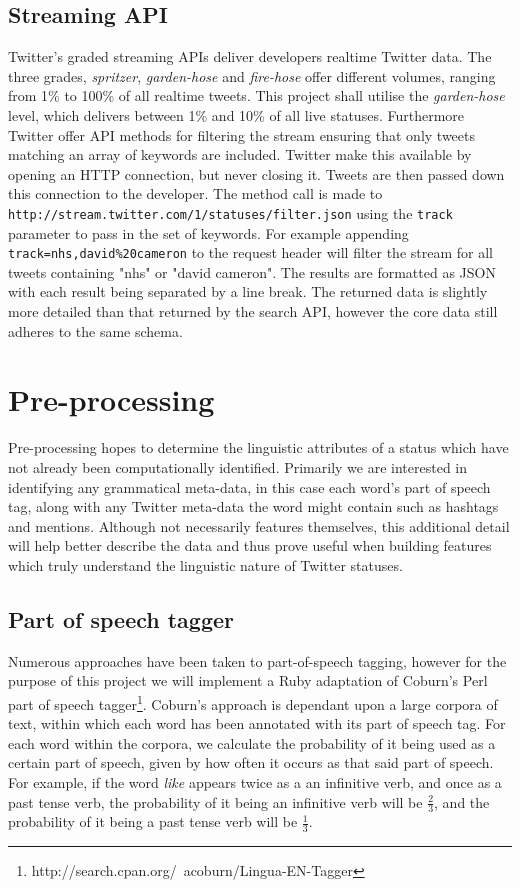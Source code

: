 \subsection{Streaming API}

Twitter's graded streaming APIs deliver developers realtime Twitter data. The three grades, \emph{spritzer}, \emph{garden-hose} and \emph{fire-hose} offer different volumes, ranging from 1\% to 100\% of all realtime tweets. This project shall utilise the \emph{garden-hose} level, which delivers between 1\% and 10\% of all live statuses. Furthermore Twitter offer API methods for filtering the stream ensuring that only tweets matching an array of keywords are included. Twitter make this available by opening an HTTP connection, but never closing it. Tweets are then passed down this connection to the developer. The method call is made to \texttt{http://\-stream\-.twitter\-.com\-/1\-/statuses\-/fi\-l\-ter\-.json} using the \texttt{track} parameter to pass in the set of keywords. For example appending \texttt{track=nhs,david\%20cameron} to the request header will filter the stream for all tweets containing "nhs" or "david cameron". The results are formatted as JSON with each result being separated by a line break. The returned data is slightly more detailed than that returned by the search API, however the core data still adheres to the same schema.

\section{Pre-processing}
\label{subjectivity:pre-processing}

Pre-processing hopes to determine the linguistic attributes of a status which have not already been computationally identified. Primarily we are interested in identifying any grammatical meta-data, in this case each word's part of speech tag, along with any Twitter meta-data the word might contain such as hashtags and mentions. Although not necessarily features themselves, this additional detail will help better describe the data and thus prove useful when building features which truly understand the linguistic nature of Twitter statuses.

\subsection{Part of speech tagger}

Numerous approaches have been taken to part-of-speech tagging, however for the purpose of this project we will implement a Ruby adaptation of Coburn's Perl part of speech tagger\footnote{http\-://\-search\-.cpan\-.org\-/~\-acoburn\-/Lingua\--EN\--Tagger}. Coburn's approach is dependant upon a large corpora of text, within which each word has been annotated with its part of speech tag. For each word within the corpora, we calculate the probability of it being used as a certain part of speech, given by how often it occurs as that said part of speech. For example, if the word \emph{like} appears twice as a an infinitive verb, and once as a past tense verb, the probability of it being an infinitive verb will be $\frac{2}{3}$, and the probability of it being a past tense verb will be $\frac{1}{3}$.

